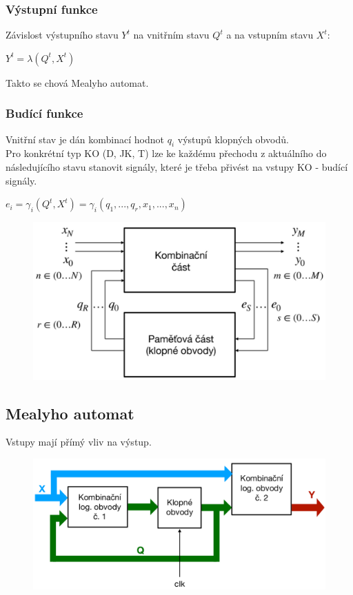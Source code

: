 \subsubsection{Výstupní funkce}
Závislost výstupního stavu \(Y^{t}\) na vnitřním stavu \(Q^t\) a na vstupním stavu \(X^t\):\\
\begin{center}
    \(Y^{t} = \lambda(Q^t,X^t)\)
\end{center}

Takto se chová Mealyho automat.\\

\subsubsection{Budící funkce}
Vnitřní stav je dán kombinací hodnot \(q_i\) výstupů klopných obvodů.\\
Pro konkrétní typ KO (D, JK, T) lze ke každému přechodu z aktuálního do následujícího stavu stanovit signály, které je třeba přivést na vstupy KO - budící signály.\\
\begin{center}
    \(e_i = \gamma_i(Q^t,X^t) = \gamma_i(q_1,...,q_r,x_1,...,x_n)\)
\end{center}

\begin{figure}[h!]
    \centering
    \includegraphics*[scale = 0.3]{img/Huffman.png}
\end{figure}
\newpage
\subsection{Mealyho automat}
Vstupy mají přímý vliv na výstup.
\begin{figure}[h!]
    \centering
    \includegraphics*[scale = 0.3]{img/Mealy.png}
\end{figure}


